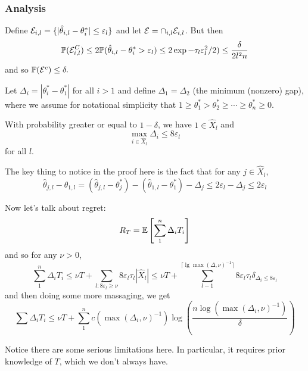 \documentclass[12pt]{article}
\begin{document}
\subsubsection{Analysis}
Define $\mathcal{E}_{i,l}=\{|\hat\theta_{i,l}-\theta_i^\ast|\le\varepsilon_l\}$ and let $\mathcal{E}=\cap_{i,l}\mathcal{E}_{i,l}$. But then 
\[\mathbb{P}(\mathcal{E}_{i,l}^C)\le 2\mathbb{P}(\hat\theta_{i,l}-\theta_i^\ast>\varepsilon_l)\le 2\exp{-\tau_l\varepsilon^2_l/2)}\le\frac{\delta}{2l^2n}\]
and so $\mathbb{P}(\mathcal{E}^c)\le\delta.$

\begin{defn}
	Let $\Delta_i=|\theta_i^\ast-\theta_1^\ast|$ for all $i>1$ and define $\Delta_1=\Delta_2$ (the minimum (nonzero) gap), where we assume for notational simplicity that $1\ge\theta_1^\ast>\theta_2^\ast\ge\cdots\ge\theta_n^\ast\ge 0$.
\end{defn}
\begin{lem}
	With probability greater or equal to $1-\delta$, we have $1\in\hat X_l$ and 
	\[\max_{i\in\hat X_l}\Delta_i\le 8\varepsilon_l\]
	for all $l$.
\end{lem}
\begin{rmk}
	The key thing to notice in the proof here is the fact that for any $j\in\hat X_l$,
	\[\hat\theta_{j,l}-\hat\theta_{1,l}=(\hat\theta_{j,l}-\theta_j^\ast)-(\hat\theta_{1,l}-\theta_1^\ast)-\Delta_j\le 2\varepsilon_l-\Delta_j\le 2\varepsilon_l\]
\end{rmk}

Now let's talk about regret:
\[R_T=\mathbb{E}\left[\sum_1^n\Delta_i T_i\right]\]
and so for any $\nu>0$,
\[\sum_1^n\Delta_iT_i\le \nu T+\sum_{l:8\varepsilon_l\ge \nu}8\varepsilon_l\tau_l|\hat X_l|\le \nu T+\sum_{l-1}^{\lceil\lg\max(\Delta,\nu)^{-1}\rceil}8\varepsilon_l\tau_l\delta_{\Delta_i\le 8\varepsilon_l}\]
and then doing some more massaging, we get 
\[\sum\Delta_iT_i\le \nu T+\sum_1^n c(\max(\Delta_i,\nu)^{-1})\log\left(\frac{n\log(\max(\Delta_i,\nu)^{-1})}{\delta}\right)\]

\begin{rmk}
	Notice there are some serious limitations here. In particular, it requires prior knowledge of $T$, which we don't always have.
\end{rmk}
\end{document}
